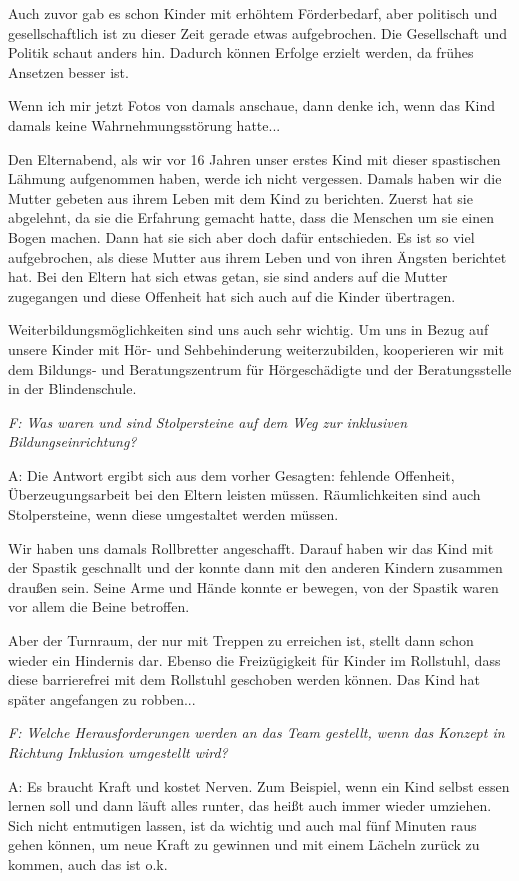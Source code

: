 Auch zuvor gab es schon Kinder mit erhöhtem Förderbedarf, aber politisch und gesellschaftlich ist zu dieser Zeit gerade etwas aufgebrochen. Die Gesellschaft und Politik schaut anders hin. Dadurch können Erfolge erzielt werden, da frühes Ansetzen besser ist. 

Wenn ich mir jetzt Fotos von damals anschaue, dann denke ich, wenn das Kind damals keine Wahrnehmungsstörung hatte...

Den Elternabend, als wir vor 16 Jahren unser erstes Kind mit dieser spastischen Lähmung aufgenommen haben, werde ich nicht vergessen. Damals haben wir die Mutter gebeten aus ihrem Leben mit dem Kind zu berichten. Zuerst hat sie abgelehnt, da sie die Erfahrung gemacht hatte, dass die Menschen um sie einen Bogen machen. Dann hat sie sich aber doch dafür entschieden. Es ist so viel aufgebrochen, als diese Mutter aus ihrem Leben und von ihren Ängsten berichtet hat. Bei den Eltern hat sich etwas getan, sie sind anders auf die Mutter zugegangen und diese Offenheit hat sich auch auf die Kinder übertragen.
 
Weiterbildungsmöglichkeiten sind uns auch sehr wichtig. 
Um uns in Bezug auf unsere Kinder mit Hör- und Sehbehinderung weiterzubilden, kooperieren wir mit dem Bildungs- und Beratungszentrum für Hörgeschädigte und der Beratungsstelle in der Blindenschule. 

\emph{F: Was waren und sind Stolpersteine auf dem Weg zur inklusiven Bildungseinrichtung?} 

A: Die Antwort ergibt sich aus dem vorher Gesagten: fehlende Offenheit, Überzeugungsarbeit bei den Eltern leisten müssen. Räumlichkeiten sind auch Stolpersteine, wenn diese umgestaltet werden müssen. 

Wir haben uns damals Rollbretter angeschafft. Darauf haben wir das Kind mit der Spastik geschnallt und der konnte dann mit den anderen Kindern zusammen draußen sein. Seine Arme und Hände konnte er bewegen, von der Spastik waren vor allem die Beine betroffen.
 
Aber der Turnraum, der nur mit Treppen zu erreichen ist, stellt dann schon wieder ein Hindernis dar. Ebenso die Freizügigkeit für Kinder im Rollstuhl, dass diese barrierefrei mit dem Rollstuhl geschoben werden können. 
Das Kind hat später angefangen zu robben...

\emph{F: Welche Herausforderungen werden an das Team gestellt, wenn das Konzept in Richtung Inklusion umgestellt wird?}

A: Es braucht Kraft und kostet Nerven. Zum Beispiel, wenn ein Kind selbst essen lernen soll und dann läuft alles runter, das heißt auch immer wieder umziehen. Sich nicht entmutigen lassen, ist da wichtig und auch mal fünf Minuten raus gehen können, um neue Kraft zu gewinnen und mit einem Lächeln zurück zu kommen, auch das ist o.k.

